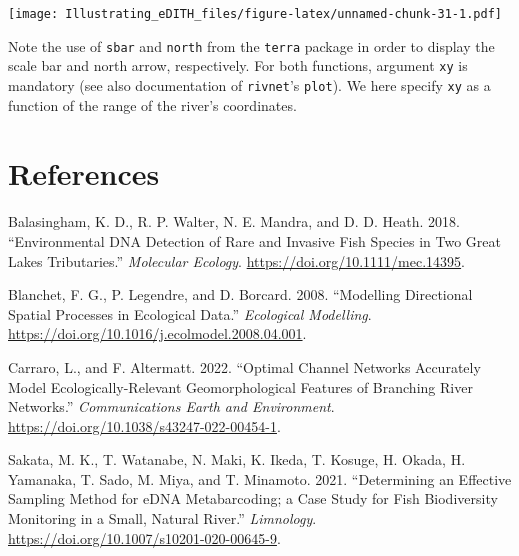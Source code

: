 \documentclass[
]{article}
\newlength{\cslhangindent}
\newlength{\cslentryspacingunit} %
\newenvironment{CSLReferences}[2] %
 {%
  \setlength{\parindent}{0pt}
  \ifodd #1
  \let\oldpar\par
  \def\par{\hangindent=\cslhangindent\oldpar}
  \fi
  \setlength{\parskip}{#2\cslentryspacingunit}
 }%
 {}
\begin{document}
\texttt{[image: Illustrating\_eDITH\_files/figure-latex/unnamed-chunk-31-1.pdf]}

Note the use of \texttt{sbar} and \texttt{north} from the \texttt{terra} package in order to display the scale bar and north arrow, respectively. For both functions, argument \texttt{xy} is mandatory (see also documentation of \texttt{rivnet}'s \texttt{plot}). We here specify \texttt{xy} as a function of the range of the river's coordinates.

\hypertarget{references}{%
\section*{References}\label{references}}

\hypertarget{refs}{}
\begin{CSLReferences}{1}{0}
\leavevmode{}%
Balasingham, K. D., R. P. Walter, N. E. Mandra, and D. D. Heath. 2018. {``Environmental DNA Detection of Rare and Invasive Fish Species in Two Great Lakes Tributaries.''} \emph{Molecular Ecology}. \url{https://doi.org/10.1111/mec.14395}.

\leavevmode{}%
Blanchet, F. G., P. Legendre, and D. Borcard. 2008. {``Modelling Directional Spatial Processes in Ecological Data.''} \emph{Ecological Modelling}. \url{https://doi.org/10.1016/j.ecolmodel.2008.04.001}.

\leavevmode{}%
Carraro, L., and F. Altermatt. 2022. {``Optimal Channel Networks Accurately Model Ecologically-Relevant Geomorphological Features of Branching River Networks.''} \emph{Communications Earth and Environment}. \url{https://doi.org/10.1038/s43247-022-00454-1}.

\leavevmode{}%
Sakata, M. K., T. Watanabe, N. Maki, K. Ikeda, T. Kosuge, H. Okada, H. Yamanaka, T. Sado, M. Miya, and T. Minamoto. 2021. {``Determining an Effective Sampling Method for eDNA Metabarcoding; a Case Study for Fish Biodiversity Monitoring in a Small, Natural River.''} \emph{Limnology}. \url{https://doi.org/10.1007/s10201-020-00645-9}.

\end{CSLReferences}
\end{document}
